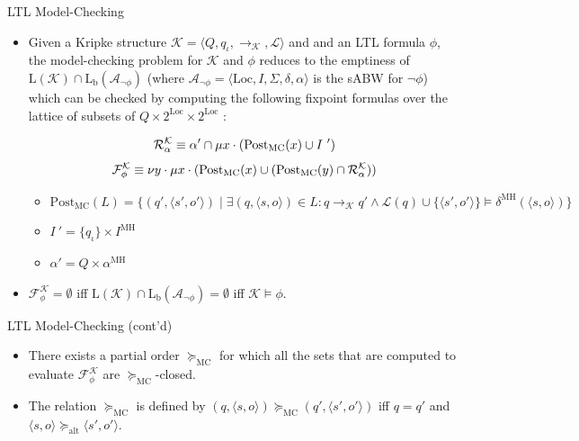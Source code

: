 \documentclass[12pt]{beamer}
\begin{document}
\begin{frame}{LTL Model-Checking}
	\begin{itemize}
		\item Given a Kripke structure $\mathcal{K} = \langle Q, q_{\iota}, \rightarrow_{\mathcal{K}}, \mathcal{L} \rangle$ and and an LTL formula $\phi$, the model-checking problem for $\mathcal{K}$ and $\phi$ reduces to the emptiness of $\text{L}(\mathcal{K}) \cap \text{L}_\text{b}(\mathcal{A}_{\neg \phi})$ (where $\mathcal{A}_{\neg \phi} = \langle \text{Loc}, I, \Sigma, \delta, \alpha \rangle$ is the sABW for $\neg \phi$) which can be checked by computing the following fixpoint formulas over the lattice of subsets of $Q \times 2^{\text{Loc}} \times 2^{\text{Loc}}$ :
		
		$$\mathcal{R}_{\alpha}^{\mathcal{K}} \equiv \alpha' \cap \mu \mathnormal{x} \cdot (\text{Post}_{\text{MC}}(\mathnormal{x}) \cup I~')$$
		$$\mathcal{F}_{\phi}^{\mathcal{K}} \equiv \nu \mathnormal{y} \cdot \mu \mathnormal{x} \cdot (\text{Post}_{\text{MC}}(\mathnormal{x}) \cup (\text{Post}_{\text{MC}}(\mathnormal{y}) \cap \mathcal{R}_{\alpha}^{\mathcal{K}}))$$

		\begin{itemize}
			\item $\text{Post}_{\text{MC}}(L) = \{(q', \langle s', o' \rangle) \mid \exists (q, \langle s, o \rangle) \in L : q \rightarrow_{\mathcal{K}} q' \land \mathcal{L}(q) \cup \{\langle s', o' \rangle\} \models \delta^{\text{MH}}(\langle s, o \rangle)\}$
			\item $I~' = \{q_{\iota}\} \times I^{\text{MH}}$
			\item $\alpha' = Q \times \alpha^{\text{MH}}$
		\end{itemize}
		\item $\mathcal{F}_{\phi}^{\mathcal{K}} = \emptyset$ iff $\text{L}(\mathcal{K}) \cap \text{L}_{\text{b}}(\mathcal{A}_{\neg \phi}) = \emptyset$ iff $\mathcal{K} \models \phi$.
	\end{itemize}
\end{frame}

\begin{frame}{LTL Model-Checking (cont'd)}
	\begin{itemize}
		\item There exists a partial order $\succeq_{\text{MC}}$ for which all the sets that are computed to evaluate $\mathcal{F}_{\phi}^{\mathcal{K}}$ are $\succeq_{\text{MC}}$-closed.
		\item The relation $\succeq_{\text{MC}}$ is defined by $(q, \langle s, o \rangle) \succeq_{\text{MC}} (q', \langle s', o' \rangle)$ iff $q = q'$ and $\langle s, o \rangle \succeq_{\text{alt}} \langle s', o' \rangle$.
	\end{itemize}
\end{frame}
\end{document}
